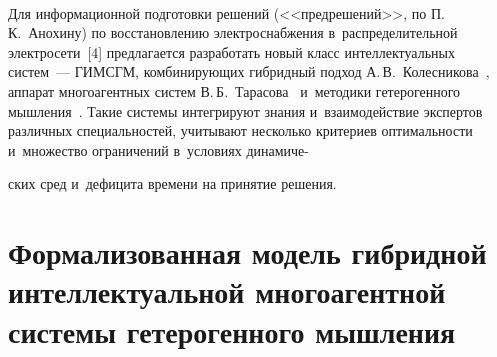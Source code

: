\begin{multicols}{2}
\begin{figure*}[b] %
\vspace*{6pt}
    \begin{center}  
  \mbox{%
 \epsfxsize=123.206mm 
 }
 \end{center}
\vspace*{-7pt}
\end{figure*}
  
  Для информационной подготовки решений (<<предрешений>>, по 
П.\,К.~Анохину) по восстановлению электроснабжения в~распределительной 
электросети~[4] предлагается разработать новый класс интеллектуальных 
систем~--- \mbox{ГИМСГМ}, комбинирующих гиб\-рид\-ный подход 
А.\,В.~Колесникова~\cite{5-kol}, аппарат многоагентных систем В.\,Б.~Тарасова~\cite{6-kol} 
и~методики гетерогенного мышления~\cite{7-kol, 8-kol, 9-kol}. Такие системы интегрируют 
знания и~взаимодействие экспертов различных специальностей, учитывают 
несколько критериев оптимальности и~множество ограничений в~условиях 
динамиче-\linebreak\vspace*{-12pt}

\pagebreak

\noindent
ских сред и~дефицита времени на принятие ре\-шения.
{ %

} 
  
\section{Формализованная модель гибридной интеллектуальной  
многоагентной системы гетерогенного мышления}


\end{multicols}

